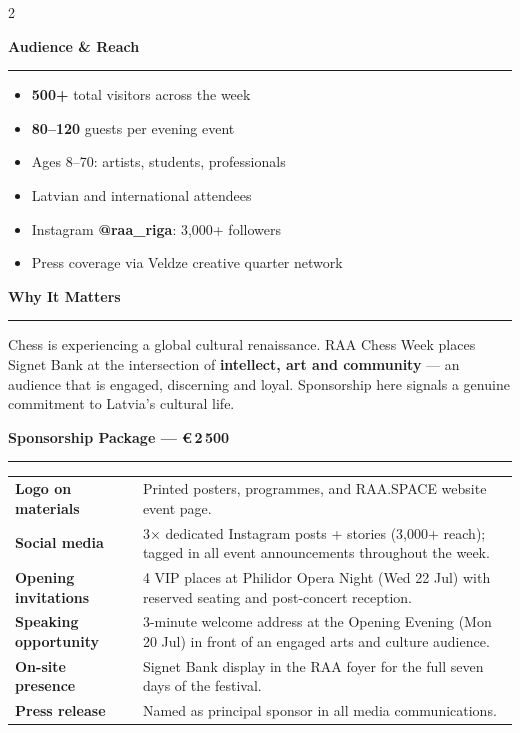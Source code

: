 \documentclass[a4paper,10pt]{article}
\newcommand{\sectionrule}[1]{%
  \vspace{2pt}%
  {\color{raared}\bfseries\large #1}\\[-2pt]%
  {\color{raared}\rule{\linewidth}{0.8pt}}%
  \vspace{2pt}%
}
\begin{document}
\begin{center}
\begin{minipage}{0.90\paperwidth}
\begin{multicols}{2}
\columnbreak

\sectionrule{Audience \& Reach}

{\small
\begin{itemize}[leftmargin=*,itemsep=2pt,topsep=0pt]
  \item \textbf{500+} total visitors across the week
  \item \textbf{80–120} guests per evening event
  \item Ages 8–70: artists, students, professionals
  \item Latvian and international attendees
  \item Instagram \textbf{@raa\_riga}: 3,000+ followers
  \item Press coverage via Veldze creative quarter network
\end{itemize}
}

\vspace{0.1cm}
\sectionrule{Why It Matters}

{\small Chess is experiencing a global cultural renaissance. RAA Chess Week places Signet Bank at the intersection of \textbf{intellect, art and community} — an audience that is engaged, discerning and loyal. Sponsorship here signals a genuine commitment to Latvia's cultural life.}

\end{multicols}

\vspace{0.05cm}

\sectionrule{Sponsorship Package — €\,2\,500}

{\small
\begin{tabularx}{\linewidth}{@{} >{\bfseries}p{3.2cm} X @{}}
Logo on materials    & Printed posters, programmes, and RAA.SPACE website event page. \\[1pt]
Social media         & 3× dedicated Instagram posts + stories (3,000+ reach); tagged in all event announcements throughout the week. \\[1pt]
Opening invitations  & 4 VIP places at Philidor Opera Night (Wed 22 Jul) with reserved seating and post-concert reception. \\[1pt]
Speaking opportunity & 3-minute welcome address at the Opening Evening (Mon 20 Jul) in front of an engaged arts and culture audience. \\[1pt]
On-site presence     & Signet Bank display in the RAA foyer for the full seven days of the festival. \\[1pt]
Press release        & Named as principal sponsor in all media communications. \\
\end{tabularx}
}


\end{minipage}
\end{center}
\end{document}
